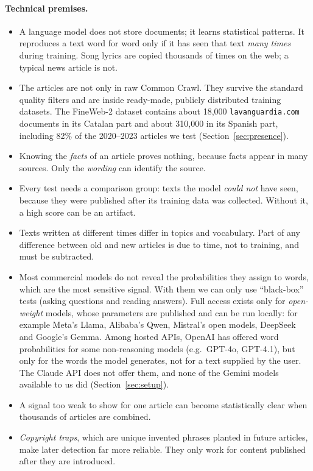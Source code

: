 \documentclass[10pt,a4paper]{article}
\begin{document}
\paragraph{Technical premises.}
\begin{itemize}
\item A language model does not store documents; it learns statistical patterns. It reproduces a text word for word
only if it has seen that text \emph{many times} during training. Song lyrics are copied thousands of times on the
web; a typical news article is not.
\item The articles are not only in raw Common Crawl. They survive the standard quality filters and are inside
ready-made, publicly distributed training datasets. The FineWeb-2 dataset contains about 18,000
\texttt{lavanguardia.com} documents in its Catalan part and about 310,000 in its Spanish part, including 82\% of the
2020--2023 articles we test (Section~\ref{sec:presence}).
\item Knowing the \emph{facts} of an article proves nothing, because facts appear in many sources. Only the
\emph{wording} can identify the source.
\item Every test needs a comparison group: texts the model \emph{could not} have seen, because they were published
after its training data was collected. Without it, a high score can be an artifact.
\item Texts written at different times differ in topics and vocabulary. Part of any difference between old and new
articles is due to time, not to training, and must be subtracted.
\item Most commercial models do not reveal the probabilities they assign to words, which are the most sensitive
signal. With them we can only use ``black-box'' tests (asking questions and reading answers). Full access exists only
for \emph{open-weight} models, whose parameters are published and can be run locally: for example Meta's Llama,
Alibaba's Qwen, Mistral's open models, DeepSeek and Google's Gemma. Among hosted APIs, OpenAI has offered word
probabilities for some non-reasoning models (e.g.\ GPT-4o, GPT-4.1), but only for the words the model generates, not
for a text supplied by the user. The Claude API does not offer them, and none of the Gemini models available to us did
(Section~\ref{sec:setup}).
\item A signal too weak to show for one article can become statistically clear when thousands of articles are
combined.
\item \emph{Copyright traps}, which are unique invented phrases planted in future articles, make later detection far
more reliable. They only work for content published after they are introduced.
\end{itemize}
\end{document}
